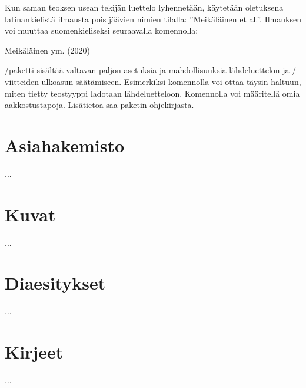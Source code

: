 Kun saman teoksen usean tekijän luettelo lyhennetään, käytetään
oletuksena latinankielistä ilmausta pois jäävien nimien tilalla:
''Meikäläinen et al.''. Ilmauksen voi muuttaa suomenkieliseksi
seuraavalla komennolla:

\begin{koodilohkosis}
\end{koodilohkosis}

\begin{tulossis}
  Meikäläinen ym. (2020)
\end{tulossis}

\-/paketti sisältää valtavan paljon asetuksia ja
mahdollisuuksia lähdeluettelon ja \=/viitteiden ulkoasun säätämiseen.
Esimerkiksi komennolla  voi ottaa
täysin haltuun, miten tietty teostyyppi ladotaan lähdeluetteloon.
Komennolla  voi määritellä omia
aakkostustapoja. Lisätietoa saa paketin ohjekirjasta.%

\section{Asiahakemisto}
\label{luku/asiasanat}

...

\section{Kuvat}
\label{luku/grafiikka}

...

\section{Diaesitykset}
\label{luku/diaesitykset}

...

\section{Kirjeet}
\label{luku/kirjeet}

...

